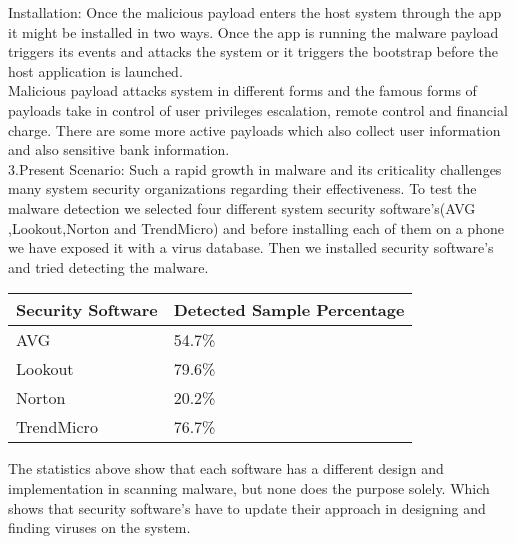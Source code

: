 \documentclass{article}
\begin{document}
Installation: Once the malicious payload enters the host system through the app it might be installed in two ways. Once the app is running the malware payload triggers its events and attacks the system or it triggers the bootstrap before the host application is launched.\\

Malicious payload attacks system in different forms and the famous forms of payloads take in control of user privileges escalation, remote control and financial charge. There are some more active payloads which also collect user information and also sensitive bank information.\\

3.Present Scenario: Such a rapid growth in malware and its criticality challenges many system security organizations regarding their effectiveness. To test the malware detection we selected four different system security software's(AVG\\,Lookout,Norton and TrendMicro) and before installing each of them on a phone we have exposed it with a virus database. Then we installed security software's and tried detecting the malware. \\

\begin{center}
\begin{tabular}{ |p{3cm}||p{3cm}| }
\hline
Security Software & Detected Sample Percentage \\ 
\hline
AVG & 54.7\%  \\ 
\hline
Lookout & 79.6\%  \\ 
\hline
Norton & 20.2\% \\
\hline
TrendMicro & 76.7\% \\
\hline
\end{tabular}
\end{center}


The statistics above show that each software has a different design and implementation in scanning malware, but none does the purpose solely. Which shows that security software's have to update their approach in designing and finding viruses on the system.\\
\end{document}
